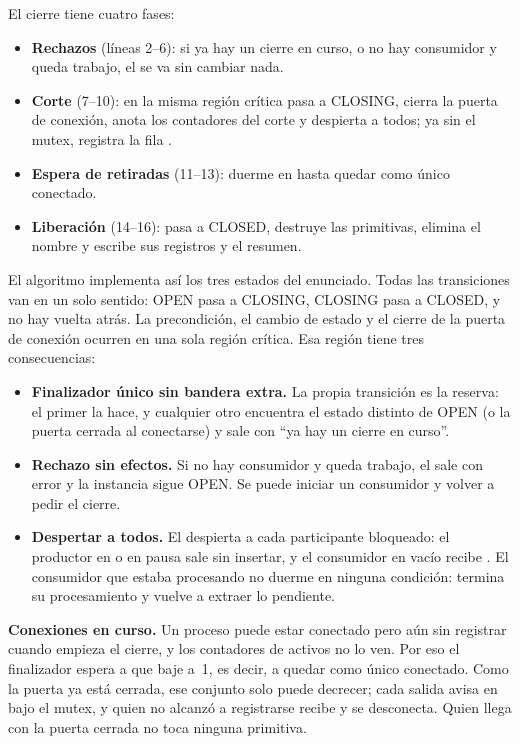 El cierre tiene cuatro fases:
\begin{itemize}
  \item \textbf{Rechazos} (líneas 2--6): si ya hay un cierre en curso, o
  no hay consumidor y queda trabajo, el  se va sin
  cambiar nada.
  \item \textbf{Corte} (7--10): en la misma región crítica pasa a
  CLOSING, cierra la puerta de conexión, anota los contadores del corte y
  despierta a todos; ya sin el mutex, registra la fila .
  \item \textbf{Espera de retiradas} (11--13): duerme en
   hasta quedar como único conectado.
  \item \textbf{Liberación} (14--16): pasa a CLOSED, destruye las
  primitivas, elimina el nombre y escribe sus registros y el resumen.
\end{itemize}
El algoritmo implementa así los tres estados del enunciado. Todas las transiciones van en un solo sentido:
OPEN pasa a CLOSING, CLOSING pasa a CLOSED, y no hay vuelta atrás. La
precondición, el cambio de estado y el cierre de la puerta de conexión
ocurren en una sola región crítica. Esa región tiene tres consecuencias:

\begin{itemize}
  \item \textbf{Finalizador único sin bandera extra.} La propia transición
  es la reserva: el primer  la hace, y cualquier otro
  encuentra el estado distinto de OPEN (o la puerta cerrada al conectarse)
  y sale con ``ya hay un cierre en curso''.
  \item \textbf{Rechazo sin efectos.} Si no hay consumidor y queda trabajo,
  el  sale con error y la instancia sigue OPEN. Se puede
  iniciar un consumidor y volver a pedir el cierre.
  \item \textbf{Despertar a todos.} El  despierta a cada
  participante bloqueado: el productor en  o en pausa sale
  sin insertar, y el consumidor en vacío recibe . El
  consumidor que estaba procesando no duerme en ninguna condición: termina
  su procesamiento y vuelve a extraer lo pendiente.
\end{itemize}

\textbf{Conexiones en curso.} Un proceso puede estar conectado pero aún
sin registrar cuando empieza el cierre, y los contadores de activos no lo
ven. Por eso el finalizador espera a que  baje a~1, es decir, a
quedar como único conectado. Como la puerta ya está cerrada, ese conjunto
solo puede decrecer; cada salida avisa en  bajo el mutex,
y quien no alcanzó a registrarse recibe  y se
desconecta. Quien llega con la puerta cerrada no toca ninguna primitiva.

